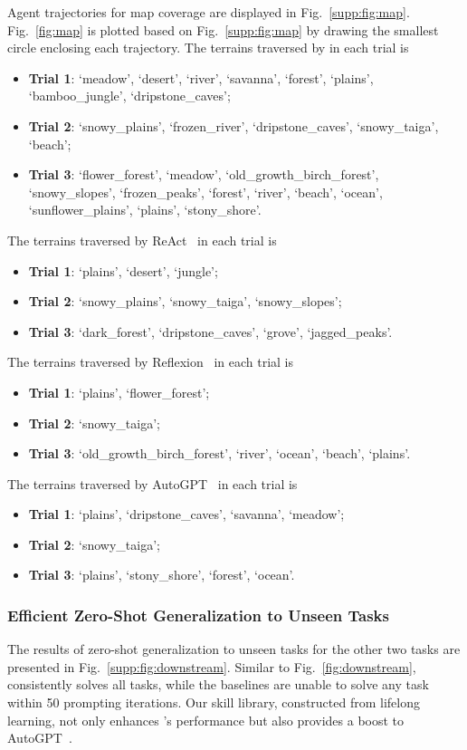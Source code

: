 Agent trajectories for map coverage are displayed in Fig.~\ref{supp:fig:map}. Fig.~\ref{fig:map} is plotted based on Fig.~\ref{supp:fig:map} by drawing the smallest circle enclosing each trajectory.
The terrains traversed by \voyager in each trial is \begin{itemize}
    \item \textbf{Trial 1}: {`meadow', `desert', `river', `savanna', `forest', `plains', `bamboo\_jungle', `dripstone\_caves'};
    \item \textbf{Trial 2}: {`snowy\_plains', `frozen\_river', `dripstone\_caves', `snowy\_taiga', `beach'};
    \item \textbf{Trial 3}: `flower\_forest', `meadow', `old\_growth\_birch\_forest', `snowy\_slopes', `frozen\_peaks', `forest', `river', `beach', `ocean', `sunflower\_plains', `plains', `stony\_shore'.
\end{itemize}
The terrains traversed by ReAct~\cite{yao2022react} in each trial is \begin{itemize}
    \item \textbf{Trial 1}: {`plains', `desert', `jungle'};
    \item \textbf{Trial 2}: {`snowy\_plains', `snowy\_taiga', `snowy\_slopes'};
    \item \textbf{Trial 3}: {`dark\_forest', `dripstone\_caves', `grove', `jagged\_peaks'}.
\end{itemize}
The terrains traversed by Reflexion~\cite{shinn2023reflexion} in each trial is \begin{itemize}
    \item \textbf{Trial 1}: {`plains', `flower\_forest'};
    \item \textbf{Trial 2}: {`snowy\_taiga'};
    \item \textbf{Trial 3}: {`old\_growth\_birch\_forest', `river', `ocean', `beach', `plains'}.
\end{itemize}
The terrains traversed by AutoGPT~\cite{autogpt} in each trial is \begin{itemize}
    \item \textbf{Trial 1}: {`plains', `dripstone\_caves', `savanna', `meadow'};
    \item \textbf{Trial 2}: {`snowy\_taiga'};
    \item \textbf{Trial 3}: {`plains', `stony\_shore', `forest', `ocean'}.
\end{itemize}

\subsubsection{Efficient Zero-Shot Generalization to Unseen Tasks}

\label{supp:sec:zero_shot}
The results of zero-shot generalization to unseen tasks for the other two tasks are presented in Fig.~\ref{supp:fig:downstream}. Similar to Fig.~\ref{fig:downstream}, \voyager consistently solves all tasks, while the baselines are unable to solve any task within 50 prompting iterations. Our skill library, constructed from lifelong learning, not only enhances \voyager's performance but also provides a boost to AutoGPT~\cite{autogpt}.

